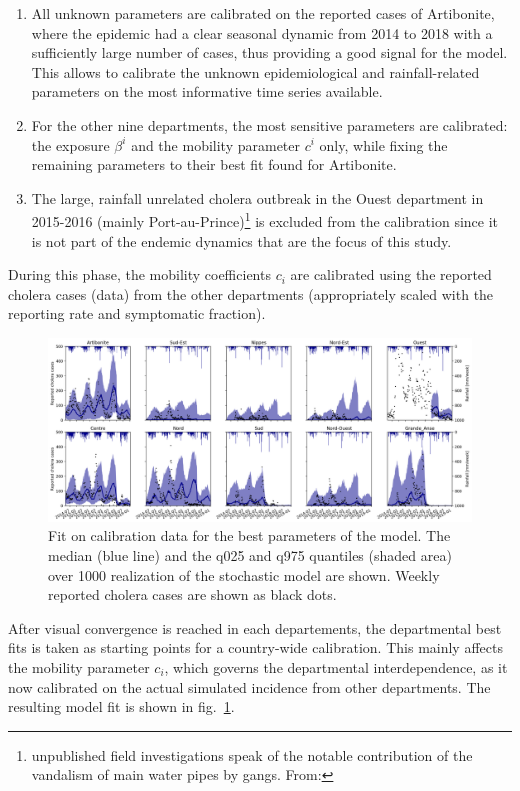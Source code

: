 \begin{enumerate}
    \item All unknown parameters are calibrated on the reported cases of Artibonite, where the epidemic had a clear seasonal dynamic from 2014 to 2018 with a sufficiently large number of cases, thus providing a good signal for the model.  This allows to calibrate the unknown epidemiological and rainfall-related parameters on the most informative time series available.
    \item For the other nine departments, the most sensitive parameters are calibrated: the exposure $\beta^i$ and the mobility parameter $c^i$ only, while fixing the remaining parameters to their best fit found for Artibonite.
    \item The large, rainfall unrelated cholera outbreak in the Ouest department in 2015-2016 (mainly Port-au-Prince)\footnote{unpublished field investigations speak of the notable contribution of the vandalism of main water pipes by gangs. From: 
} is excluded from the calibration since it is not part of the endemic dynamics that are the focus of  this study.
\end{enumerate}

During this phase, the mobility coefficients $c_i$ are calibrated using the reported cholera cases (data) from the other departments (appropriately scaled with the reporting rate and symptomatic fraction).
\begin{figure}[htbp]
\begin{center}
\includegraphics[width=1.0\textwidth]{fig_cholera-haiti-ocv/fit.png}
\caption[Fit on calibration data for the best parameter of the model]{Fit on calibration data for the best parameters of the model. The median (blue line) and the q025 and q975 quantiles (shaded area) over 1000 realization of the stochastic model are shown. Weekly reported cholera cases are shown as black dots.}
\label{fitEPFL}
\end{center}
\end{figure}
After visual convergence is reached in each departements, the departmental best fits is taken as starting points for a country-wide calibration. This mainly affects the mobility parameter $c_i$, which governs the departmental interdependence, as it now calibrated on the actual simulated incidence from other departments. The resulting model fit is shown in fig.~\ref{fitEPFL}. 

